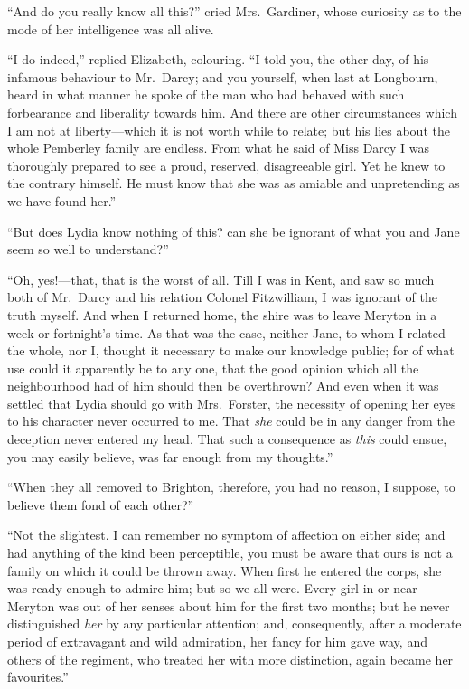 ``And do you really know all this?'' cried Mrs.\ Gardiner, whose
curiosity as to the mode of her intelligence was all alive.

``I do indeed,'' replied Elizabeth, colouring.  ``I told you, the
other day, of his infamous behaviour to Mr.\ Darcy; and you
yourself, when last at Longbourn, heard in what manner he
spoke of the man who had behaved with such forbearance and
liberality towards him.  And there are other circumstances which
I am not at liberty---which it is not worth while to relate; but
his lies about the whole Pemberley family are endless.  From what
he said of Miss Darcy I was thoroughly prepared to see a proud,
reserved, disagreeable girl.  Yet he knew to the contrary himself.
He must know that she was as amiable and unpretending as we
have found her.''

``But does Lydia know nothing of this?  can she be ignorant of
what you and Jane seem so well to understand?''

``Oh, yes!---that, that is the worst of all.  Till I was in Kent,
and saw so much both of Mr.\ Darcy and his relation Colonel
Fitzwilliam, I was ignorant of the truth myself.  And when I
returned home, the \gdash{}shire was to leave Meryton in a week or
fortnight's time.  As that was the case, neither Jane, to whom
I related the whole, nor I, thought it necessary to make our
knowledge public; for of what use could it apparently be to any
one, that the good opinion which all the neighbourhood had of
him should then be overthrown?  And even when it was settled
that Lydia should go with Mrs.\ Forster, the necessity of opening
her eyes to his character never occurred to me.  That \emph{she} could
be in any danger from the deception never entered my head.
That such a consequence as \emph{this} could ensue, you may easily
believe, was far enough from my thoughts.''

``When they all removed to Brighton, therefore, you had no
reason, I suppose, to believe them fond of each other?''

``Not the slightest.  I can remember no symptom of affection on
either side; and had anything of the kind been perceptible, you
must be aware that ours is not a family on which it could be
thrown away.  When first he entered the corps, she was ready
enough to admire him; but so we all were.  Every girl in or
near Meryton was out of her senses about him for the first
two months; but he never distinguished \emph{her} by any particular
attention; and, consequently, after a moderate period of
extravagant and wild admiration, her fancy for him gave
way, and others of the regiment, who treated her with more
distinction, again became her favourites.''

